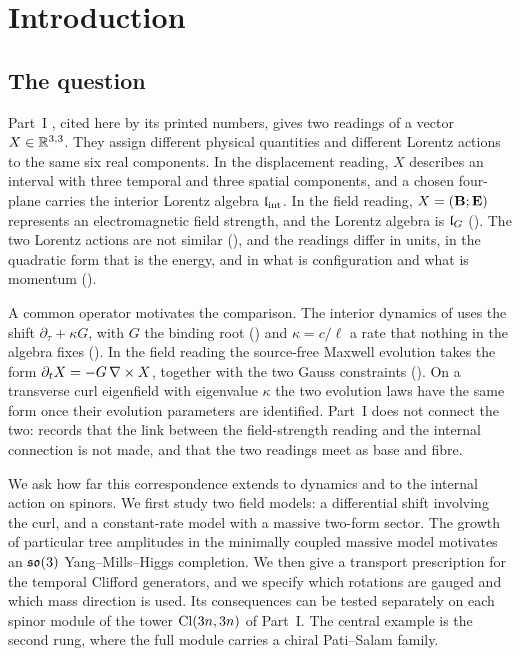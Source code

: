 \chapter{Introduction}
\label{ch:intro}

\section{The question}

Part~I \cite{PartI}, cited here by its printed numbers, gives two readings of a vector $X\in\mathbb{R}^{3,3}$. They assign different physical
quantities and different Lorentz actions to the same six real components. In the displacement reading, $X$ describes an interval with three
temporal and three spatial components, and a chosen four-plane carries the interior Lorentz algebra $\mathfrak l_{\rm int}$. In the field reading,
$X=(\mathbf B;\mathbf E)$ represents an electromagnetic field strength, and the Lorentz algebra is $\mathfrak l_G$ (). The two Lorentz actions are not
similar (), and the readings differ in units, in the quadratic form that is the energy, and in what is configuration and what is
momentum ().

A common operator motivates the comparison. The interior dynamics of  uses the shift $\partial_\tau+\kappa G$, with $G$ the
binding root () and $\kappa=c/\ell$ a rate that nothing in the algebra fixes (). In the field reading the
source-free Maxwell evolution takes the form $\partial_tX=-G\,\nabla\times X$, together with the two Gauss constraints (). On a
transverse curl eigenfield with eigenvalue $\kappa$ the two evolution laws have the same form once their evolution parameters are identified.
Part~I does not connect the two:  records that the link between the field-strength reading and the internal connection is not
made, and  that the two readings meet as base and fibre.

We ask how far this correspondence extends to dynamics and to the internal action on spinors. We first study two field models: a
differential shift involving the curl, and a constant-rate model with a massive two-form sector. The growth of particular tree amplitudes in
the minimally coupled massive model motivates an $\mathfrak{so}(3)$ Yang--Mills--Higgs completion. We then give a transport prescription for the temporal
Clifford generators, and we specify which rotations are gauged and which mass direction is used. Its consequences can be tested separately
on each spinor module of the tower $\mathrm{Cl}(3n,3n)$ of Part~I. The central example is the second rung, where the full module carries a chiral
Pati--Salam family.

